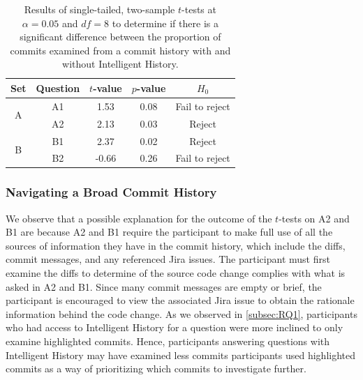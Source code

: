 \begin{table}[h]
  \caption{
    Results of single-tailed, two-sample $t$-tests at $\alpha = 0.05$ and $df = 8$ to determine if there is a significant difference between the proportion of commits examined from a commit history
    with and without Intelligent History.
  }
  \centering
  \begin{tabular}{@{}ccccc@{}}
    \toprule
    Set                                     & Question               & \multicolumn{1}{c}{$t$-value} & \multicolumn{1}{c}{$p$-value} & $H_{0}$ \\ \midrule
    \multicolumn{1}{c|}{\multirow{2}{*}{A}} & \multicolumn{1}{c|}{A1} & 1.53                        & 0.08                        & Fail to reject   \\ \cmidrule(l){2-5} 
    \multicolumn{1}{c|}{}                   & \multicolumn{1}{c|}{A2} & 2.13                        & 0.03                        & Reject   \\ \midrule
    \multicolumn{1}{c|}{\multirow{2}{*}{B}} & \multicolumn{1}{c|}{B1} & 2.37                        & 0.02                        & Reject   \\ \cmidrule(l){2-5} 
    \multicolumn{1}{c|}{}                   & \multicolumn{1}{c|}{B2} & -0.66                       & 0.26                        & Fail to reject   \\ \bottomrule
  \end{tabular}
  \label{tab:t-test}
\end{table}

\subsubsection{Navigating a Broad Commit History}

We observe that a possible explanation for the outcome of the $t$-tests on A2 and B1 are
because A2 and B1 require the participant to make full use of all the sources of
information they have in the commit history, which include the diffs, commit messages,
and any referenced Jira issues.
The participant must first examine the diffs to determine of the source code change
complies with what is asked in A2 and B1.
Since many commit messages are empty or brief, the participant is encouraged to view
the associated Jira issue to obtain the rationale information behind the code change.
As we observed in \autoref{subsec:RQ1}, participants who had access to Intelligent History for a question
were more inclined to only examine highlighted commits.
Hence, participants answering questions with Intelligent History may have examined less commits
participants used highlighted commits as a way of prioritizing which commits to investigate further.

